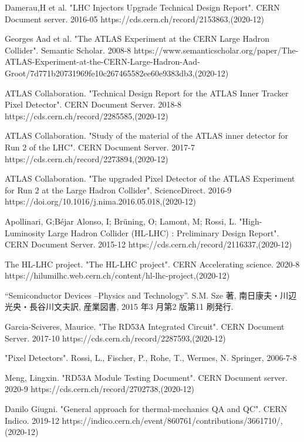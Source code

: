 \begin{thebibliography}{9}

Damerau,H et al. "LHC Injectors Upgrade Technical Design Report". CERN Document server. 2016-05
https://cds.cern.ch/record/2153863,(2020-12)

Georges Aad et al. "The ATLAS Experiment at the CERN Large Hadron Collider". Semantic Scholar. 2008-8
https://www.semanticscholar.org/paper/The-ATLAS-Experiment-at-the-CERN-Large-Hadron-Aad-Groot/7d771b20731969fe10c267465582ee60e9383db3,(2020-12)

ATLAS Collaboration. "Technical Design Report for the ATLAS Inner Tracker Pixel Detector". CERN Document Server. 2018-8
https://cds.cern.ch/record/2285585,(2020-12)

ATLAS Collaboration. "Study of the material of the ATLAS inner detector for Run 2 of the LHC". CERN Document Server. 2017-7
https://cds.cern.ch/record/2273894,(2020-12)

ATLAS Collaboration. "The upgraded Pixel Detector of the ATLAS Experiment for Run 2 at the Large Hadron Collider". ScienceDirect. 2016-9
https://doi.org/10.1016/j.nima.2016.05.018,(2020-12)

Apollinari, G;Béjar Alonso, I; Brüning, O; Lamont, M; Rossi, L. "High-Luminosity Large Hadron Collider (HL-LHC) : Preliminary Design Report". CERN Document Server. 2015-12
https://cds.cern.ch/record/2116337,(2020-12)

The HL-LHC project. "The HL-LHC project". CERN Accelerating science. 2020-8
https://hilumilhc.web.cern.ch/content/hl-lhc-project,(2020-12)

“Semiconductor Devices –Physics and Technology”.
S.M. Sze 著, 南日康夫・川辺光央・長谷川文夫訳, 産業図書, 2015 年3 月第2 版第11 刷発行.

Garcia-Sciveres, Maurice. "The RD53A Integrated Circuit". CERN Document Server. 2017-10
https://cds.cern.ch/record/2287593,(2020-12)

"Pixel Detectors". 
Rossi, L., Fischer, P., Rohe, T., Wermes, N. Springer, 2006-7-8

Meng, Lingxin. "RD53A Module Testing Document". CERN Document server. 2020-9
https://cds.cern.ch/record/2702738,(2020-12)

Danilo Giugni. "General approach for thermal-mechanics QA and QC". CERN Indico. 2019-12
https://indico.cern.ch/event/860761/contributions/3661710/,(2020-12)


\end{thebibliography}
